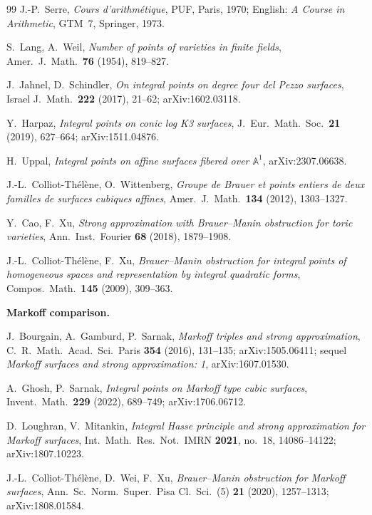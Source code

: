\documentclass[11pt]{article}
\theoremstyle{plain}
\theoremstyle{definition}
\theoremstyle{remark}
\renewcommand{\_}{\textunderscore\allowbreak}
\begin{document}
\begin{thebibliography}{99}
 J.-P.~Serre, \emph{Cours d'arithm\'etique}, PUF, Paris, 1970; English:
\emph{A Course in Arithmetic}, GTM~7, Springer, 1973.

 S.~Lang, A.~Weil, \emph{Number of points of varieties in finite fields},
Amer.\ J.\ Math.\ \textbf{76} (1954), 819--827.

 J.~Jahnel, D.~Schindler, \emph{On integral points on degree four
del Pezzo surfaces}, Israel J.\ Math.\ \textbf{222} (2017), 21--62; arXiv:1602.03118.

 Y.~Harpaz, \emph{Integral points on conic log K3 surfaces}, J.\ Eur.\ Math.\
Soc.\ \textbf{21} (2019), 627--664; arXiv:1511.04876.

 H.~Uppal, \emph{Integral points on affine surfaces fibered over $\mathbb A^1$},
arXiv:2307.06638.

 J.-L.~Colliot-Th\'el\`ene, O.~Wittenberg, \emph{Groupe de Brauer et
points entiers de deux familles de surfaces cubiques affines}, Amer.\ J.\ Math.\ \textbf{134}
(2012), 1303--1327.

 Y.~Cao, F.~Xu, \emph{Strong approximation with Brauer--Manin obstruction for
toric varieties}, Ann.\ Inst.\ Fourier \textbf{68} (2018), 1879--1908.

 J.-L.~Colliot-Th\'el\`ene, F.~Xu, \emph{Brauer--Manin obstruction for integral
points of homogeneous spaces and representation by integral quadratic forms}, Compos.\ Math.\
\textbf{145} (2009), 309--363.

\bigskip\noindent\textbf{Markoff comparison.}

 J.~Bourgain, A.~Gamburd, P.~Sarnak, \emph{Markoff triples and strong
approximation}, C.\ R.\ Math.\ Acad.\ Sci.\ Paris \textbf{354} (2016), 131--135;
arXiv:1505.06411; sequel \emph{Markoff surfaces and strong approximation: 1},
arXiv:1607.01530.

 A.~Ghosh, P.~Sarnak, \emph{Integral points on Markoff type cubic
surfaces}, Invent.\ Math.\ \textbf{229} (2022), 689--749; arXiv:1706.06712.

\bibitem{LoughranMitankin2021} D.~Loughran, V.~Mitankin, \emph{Integral Hasse principle and
strong approximation for Markoff surfaces}, Int.\ Math.\ Res.\ Not.\ IMRN \textbf{2021}, no.~18,
14086--14122; arXiv:1807.10223.

 J.-L.~Colliot-Th\'el\`ene, D.~Wei, F.~Xu, \emph{Brauer--Manin obstruction for
Markoff surfaces}, Ann.\ Sc.\ Norm.\ Super.\ Pisa Cl.\ Sci.\ (5) \textbf{21} (2020), 1257--1313;
arXiv:1808.01584.


\end{thebibliography}
\end{document}
